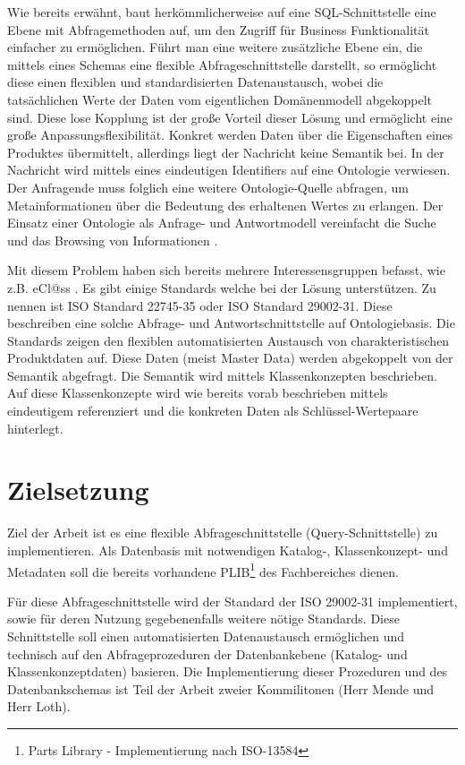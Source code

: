 Wie bereits erwähnt, baut herkömmlicherweise auf eine SQL-Schnittstelle eine Ebene mit Abfragemethoden auf, um den Zugriff für Business Funktionalität einfacher zu ermöglichen. Führt man eine weitere zusätzliche Ebene ein, die mittels eines Schemas eine flexible \gls{Abfrageschnittstelle} darstellt, so ermöglicht diese einen flexiblen und standardisierten Datenaustausch, wobei die tatsächlichen Werte der Daten vom eigentlichen Domänenmodell abgekoppelt sind. Diese lose Kopplung ist der große Vorteil dieser Lösung und ermöglicht eine große Anpassungsflexibilität. Konkret werden Daten über die Eigenschaften eines Produktes übermittelt, allerdings liegt der Nachricht keine Semantik bei. In der Nachricht wird mittels eines eindeutigen Identifiers auf eine \gls{Ontologie} verwiesen. Der Anfragende muss folglich eine weitere \gls{Ontologie}-Quelle abfragen, um Metainformationen über die Bedeutung des erhaltenen Wertes zu erlangen. 
Der Einsatz einer \gls{Ontologie} als Anfrage- und Antwortmodell vereinfacht die Suche und das Browsing von Informationen \citep[vgl.][S. 24f]{Hemmje}.

Mit diesem Problem haben sich bereits mehrere Interessensgruppen befasst, wie z.B. eCl@ss \citep[vgl.][]{uiterwykEclass}. Es gibt einige Standards welche bei der Lösung unterstützen. Zu nennen ist ISO Standard 22745-35 oder ISO Standard 29002-31. Diese beschreiben eine solche Abfrage- und Antwortschnittstelle auf Ontologiebasis. Die Standards zeigen den flexiblen automatisierten Austausch von charakteristischen Produktdaten auf. Diese Daten (meist Master Data) werden abgekoppelt von der Semantik abgefragt. Die Semantik wird mittels Klassenkonzepten beschrieben. Auf diese Klassenkonzepte wird wie bereits vorab beschrieben mittels eindeutigem  referenziert und die konkreten Daten als Schlüssel-Wertepaare hinterlegt.   

\section{Zielsetzung}

Ziel der Arbeit ist es eine flexible Abfrageschnittstelle (Query-Schnittstelle) zu implementieren. Als Datenbasis mit notwendigen Katalog-, Klassenkonzept- und Metadaten soll die bereits vorhandene PLIB\footnote{Parts Library - Implementierung nach ISO-13584} des Fachbereiches dienen. 

Für diese Abfrageschnittstelle wird der Standard der ISO 29002-31 implementiert, sowie für deren Nutzung gegebenenfalls weitere nötige Standards. Diese Schnittstelle soll einen automatisierten Datenaustausch ermöglichen und technisch auf den Abfrageprozeduren der Datenbankebene (Katalog- und Klassenkonzeptdaten) basieren. Die Implementierung dieser Prozeduren und des Datenbankschemas ist Teil der Arbeit zweier Kommilitonen (Herr Mende und Herr Loth).
 

